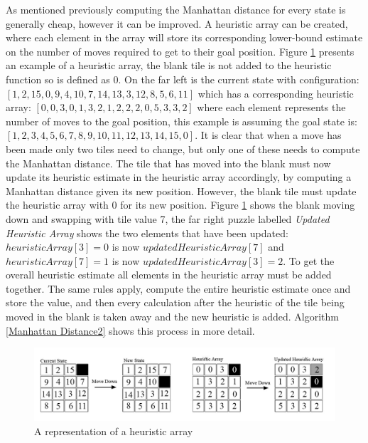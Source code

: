 \documentclass[final]{cmpreport}
\begin{document}
As mentioned previously computing the Manhattan distance for every state is generally cheap, however it can be improved. A heuristic array can be created, where each element in the array will store its corresponding lower-bound estimate on the number of moves required to get to their goal position. Figure \ref{fig:heuristic_array} presents an example of a heuristic array, the blank tile is not added to the heuristic function so is defined as 0. On the far left is the current state with configuration: $[1,2,15,0,9,4,10,7,14,13,3,12,8,5,6,11]$ which has a corresponding heuristic array: $[0,0,3,0,1,3,2,1,2,2,2,0,5,3,3,2]$ where each element represents the number of moves to the goal position, this example is assuming the goal state is: $[1,2,3,4,5,6,7,8,9,10,11,12,13,14,15,0]$. It is clear that when a move has been made only two tiles need to change, but only one of these needs to compute the Manhattan distance. The tile that has moved into the blank must now update its heuristic estimate in the heuristic array accordingly, by computing a Manhattan distance given its new position. However, the blank tile must update the heuristic array with 0 for its new position. Figure \ref{fig:heuristic_array} shows the blank moving down and swapping with tile value 7, the far right puzzle labelled \textit{Updated Heuristic Array} shows the two elements that have been updated: $heuristicArray[3]=0$ is now $updatedHeuristicArray[7]$ and $heuristicArray[7]=1$ is now $updatedHeuristicArray[3]=2$. To get the overall heuristic estimate all elements in the heuristic array must be added together. The same rules apply, compute the entire heuristic estimate once and store the value, and then every calculation after the heuristic of the tile being moved in the blank is taken away and the new heuristic is added. Algorithm \ref{Manhattan Distance2} shows this process in more detail.



\begin{figure}[ht]
	\centering
	\includegraphics[width=1.1\textwidth]{heuristic_array}
	\captionsetup{justification=centering}
	\caption{A representation of a heuristic array}
	\label{fig:heuristic_array}
\end{figure}
\end{document}
